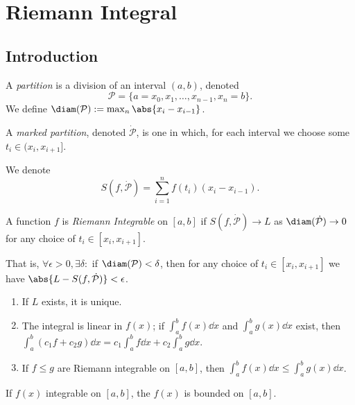 \section{Riemann Integral}

\subsection{Introduction}
\begin{definition}[Partitions]
    A \emph{partition} is a division of an interval $(a, b)$, denoted \[
    \mathcal{P} = \{a = x_0, x_1, \dots, x_{n-1}, x_n = b\}    .
    \]
    We define $\diam (\mathcal{P})  := \max_{n} \abs{x_{i} - x_{i-1}}$.

    A \emph{marked partition}, denoted $\dot{\mathcal{P}}$, is one in which, for each interval we choose some $t_i \in (x_i, x_{i+1}]$.
\end{definition}

\begin{definition}
    We denote \[
    S(f,\dot{\mathcal{P}}) = \sum_{i=1}^n f(t_i)(x_{i}-x_{i-1}).
    \]
\end{definition}

\begin{definition}
    A function $f$ is \emph{Riemann Integrable} on $[a, b]$ if $S(f, \dot{\mathcal{P}}) \to L$ as $\diam(\dot{\mathcal{P}}) \to 0$ for any choice of $t_i \in [x_i, x_{i+1}]$.

    That is, $\forall \epsilon > 0, \exists \delta : $ if $\diam(\mathcal{P}) < \delta$, then for any choice of $t_i \in [x_i, x_{i+1}]$ we have $\abs{L - S(f, \dot{\mathcal{P}})} < \epsilon$.
\end{definition}

\begin{proposition}
    \begin{enumerate}
        \item If $L$ exists, it is unique.
        \item The integral is linear in $f(x)$; if $\int_a^b f(x)\dd{x}$ and $\int_a^b g(x) \dd{x}$ exist, then $\int_a^b (c_1 f+ c_2 g)\dd{x} = c_1\int_a^b f \dd{x} + c_2 \int_a^b g \dd{x}$.
        \item If $f \leq g$ are Riemann integrable on $[a, b]$, then $\int_a^b f(x) \dd{x} \leq \int_a^b g(x) \dd{x}$.
    \end{enumerate}
\end{proposition}

\begin{proposition}
    If $f(x)$ integrable on $[a, b]$, the $f(x)$ is bounded on $[a, b]$.
\end{proposition}

